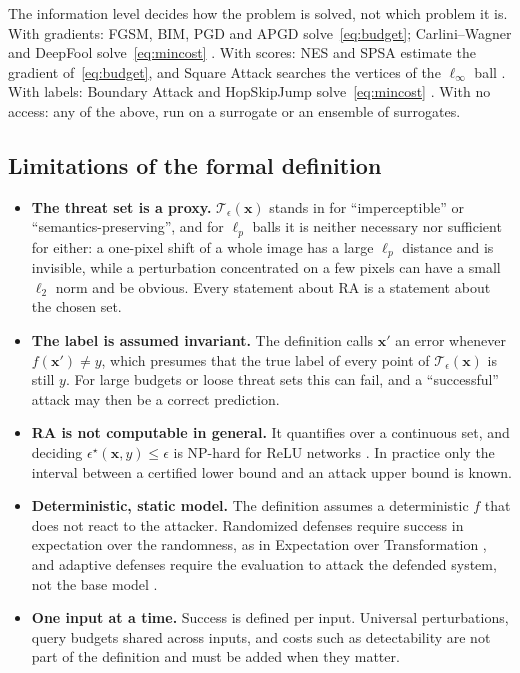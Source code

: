 \documentclass[10pt,a4paper]{extarticle}
\theoremstyle{definition}
\newcommand{\x}{\mathbf{x}}
\newcommand{\xadv}{\mathbf{x}'}
\newcommand{\T}{\mathcal{T}}
\begin{document}
The information level decides how the problem is solved, not which problem it is. With gradients: FGSM, BIM, PGD and APGD solve~\eqref{eq:budget}; Carlini--Wagner and DeepFool solve~\eqref{eq:mincost} \citep{madry2018towards,carlini2017towards,moosavi2016deepfool}. With scores: NES and SPSA estimate the gradient of~\eqref{eq:budget}, and Square Attack searches the vertices of the $\ell_\infty$ ball \citep{ilyas2018blackbox,andriushchenko2020square}. With labels: Boundary Attack and HopSkipJump solve~\eqref{eq:mincost} \citep{brendel2018decision,chen2020hopskipjump}. With no access: any of the above, run on a surrogate or an ensemble of surrogates.

\subsection{Limitations of the formal definition}

\begin{itemize}[leftmargin=1.5em]
  \item \textbf{The threat set is a proxy.} $\T_\epsilon(\x)$ stands in for \enquote{imperceptible} or \enquote{semantics-preserving}, and for $\ell_p$ balls it is neither necessary nor sufficient for either: a one-pixel shift of a whole image has a large $\ell_p$ distance and is invisible, while a perturbation concentrated on a few pixels can have a small $\ell_2$ norm and be obvious. Every statement about RA is a statement about the chosen set.
  \item \textbf{The label is assumed invariant.} The definition calls $\xadv$ an error whenever $f(\xadv)\neq y$, which presumes that the true label of every point of $\T_\epsilon(\x)$ is still $y$. For large budgets or loose threat sets this can fail, and a \enquote{successful} attack may then be a correct prediction.
  \item \textbf{RA is not computable in general.} It quantifies over a continuous set, and deciding $\epsilon^\star(\x,y)\le\epsilon$ is NP-hard for ReLU networks \citep{katz2017reluplex}. In practice only the interval between a certified lower bound and an attack upper bound is known.
  \item \textbf{Deterministic, static model.} The definition assumes a deterministic $f$ that does not react to the attacker. Randomized defenses require success in expectation over the randomness, as in Expectation over Transformation \citep{athalye2018eot}, and adaptive defenses require the evaluation to attack the defended system, not the base model \citep{tramer2020adaptive}.
  \item \textbf{One input at a time.} Success is defined per input. Universal perturbations, query budgets shared across inputs, and costs such as detectability are not part of the definition and must be added when they matter.
\end{itemize}
\end{document}
